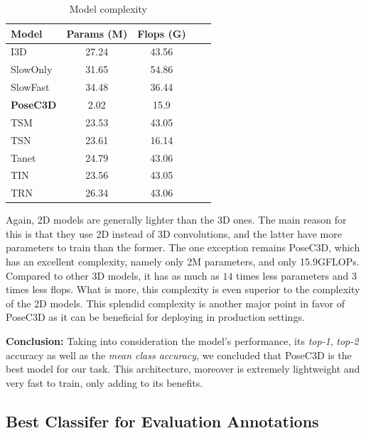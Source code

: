 \documentclass[extern,palatino]{cgMA}
\begin{document}
\begin{table}[h!]
  \begin{center}
    \caption{Model complexity}
    \label{tab:research_question_1_complexity}
    \begin{tabular}{l|c|c|c|c}
      \textbf{Model} & \textbf{Params (M)} & \textbf{Flops (G)}\\
      \hline
      I3D & 27.24 & 43.56\\
      SlowOnly & 31.65 & 54.86\\
      SlowFast & 34.48 & 36.44\\
      \textbf{PoseC3D} & 2.02 & 15.9\\
      TSM & 23.53 & 43.05\\
      TSN & 23.61 & 16.14\\
      Tanet & 24.79 & 43.06\\
      TIN & 23.56 & 43.05\\
      TRN & 26.34 & 43.06\\
    \end{tabular}
  \end{center}
\end{table}

\bigskip
\noindent Again, 2D models are generally lighter than the 3D ones. The main reason for this is that they use 2D instead of 3D convolutions, and the latter have more parameters to train than the former. The one exception remains PoseC3D, which has an excellent complexity, namely only 2M parameters, and only 15.9GFLOPs. Compared to other 3D models, it has as much as $14$ times less parameters and $3$ times less flops. What is more, this complexity is even superior to the complexity of the 2D models. This splendid complexity is another major point in favor of PoseC3D as it can be beneficial for deploying in production settings.

\bigskip \bigskip
\noindent \textbf{Conclusion:} Taking into consideration the model's performance, its \textit{top-1}, \textit{top-2} accuracy as well as the \textit{mean class accuracy}, we concluded that PoseC3D is the best model for our task. This architecture, moreover is extremely lightweight and very fast to train, only adding to its benefits.


\newpage
\subsection{Best Classifer for Evaluation Annotations}
\label{research_question_2}

\end{document}
